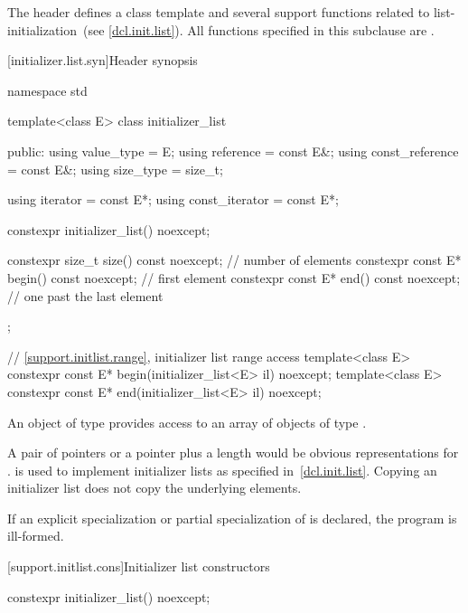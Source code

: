 \pnum
The header  defines a class template and several
support functions related to list-initialization~(see \ref{dcl.init.list}).
%
All functions specified in this subclause are .

[initializer.list.syn]{Header  synopsis}
%
%
%

\begin{codeblock}
namespace std {
  template<class E> class initializer_list {
  public:
    using value_type      = E;
    using reference       = const E&;
    using const_reference = const E&;
    using size_type       = size_t;

    using iterator        = const E*;
    using const_iterator  = const E*;

    constexpr initializer_list() noexcept;

    constexpr size_t size() const noexcept;     // number of elements
    constexpr const E* begin() const noexcept;  // first element
    constexpr const E* end() const noexcept;    // one past the last element
  };

  // \ref{support.initlist.range}, initializer list range access
  template<class E> constexpr const E* begin(initializer_list<E> il) noexcept;
  template<class E> constexpr const E* end(initializer_list<E> il) noexcept;
}
\end{codeblock}

\pnum
An object of type  provides access to an array of
objects of type .
\begin{note}
A pair of pointers or a pointer plus
a length would be obvious representations for .
 is used to implement initializer lists as specified
in~\ref{dcl.init.list}. Copying an initializer list does not copy the underlying
elements.
\end{note}

\pnum
If an explicit specialization or partial specialization of
 is declared, the program is ill-formed.

[support.initlist.cons]{Initializer list constructors}

%
\begin{itemdecl}
constexpr initializer_list() noexcept;
\end{itemdecl}

